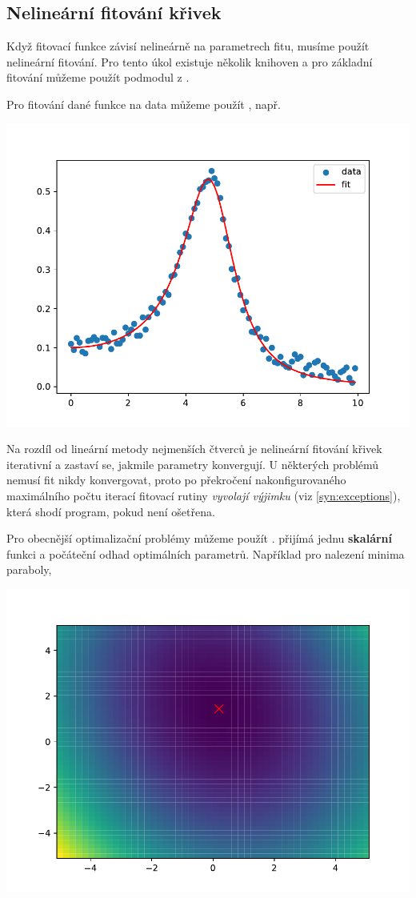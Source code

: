 \subsection{Nelineární fitování křivek}
Když fitovací funkce závisí nelineárně na parametrech fitu, musíme použít nelineární fitování. Pro tento úkol existuje několik knihoven a pro základní fitování můžeme použít podmodul  z .

Pro fitování dané funkce na data můžeme použít , např.

\begin{center}
    \includegraphics[width=0.5\linewidth]{curve_fit.pdf}
\end{center}

Na rozdíl od lineární metody nejmenších čtverců je nelineární fitování křivek iterativní a zastaví se, jakmile parametry konvergují. U některých problémů nemusí fit nikdy konvergovat, proto po překročení nakonfigurovaného maximálního počtu iterací fitovací rutiny \emph{vyvolají výjimku} (viz \ref{syn:exceptions}), která shodí program, pokud není ošetřena.

Pro obecnější optimalizační problémy můžeme použít .  přijímá jednu \textbf{skalární} funkci a počáteční odhad optimálních parametrů. Například pro nalezení minima paraboly,

\begin{center}
    \includegraphics[width=0.5\linewidth]{parabola-minimize.pdf}
\end{center}

